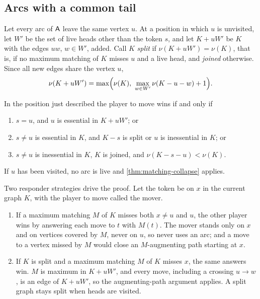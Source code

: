 \subsection{Arcs with a common tail}

Let every arc of $\mathsf{A}$ leave the same vertex $u$. At a position in which $u$ is unvisited, let $W'$ be the set of live heads other than the token $s$, and let $K+uW'$ be $K$ with the edges $uw$, $w\in W'$, added. Call $K$ \emph{split} if $\nu(K+uW')=\nu(K)$, that is, if no maximum matching of $K$ misses $u$ and a live head, and \emph{joined} otherwise. Since all new edges share the vertex $u$,
\begin{equation}\label{eq:star-nu}
\nu(K+uW')=\max\Bigl(\nu(K),\ \max_{w\in W'}\nu(K-u-w)+1\Bigr).
\end{equation}

\begin{theorem}\label{thm:common-tail}
In the position just described the player to move wins if and only if
\begin{enumerate}[label=\textup{(\arabic*)}]
\item $s=u$, and $u$ is essential in $K+uW'$; or
\item $s\neq u$ is essential in $K$, and $K-s$ is split or $u$ is inessential in $K$; or
\item $s\neq u$ is inessential in $K$, $K$ is joined, and $\nu(K-s-u)<\nu(K)$.
\end{enumerate}
If $u$ has been visited, no arc is live and \cref{thm:matching-collapse} applies.
\end{theorem}

Two responder strategies drive the proof. Let the token be on $x$ in the current graph $K$, with the player to move called the mover.

\begin{enumerate}[label=(T\arabic*$'$),start=2]
\item If a maximum matching $M$ of $K$ misses both $x\neq u$ and $u$, the other player wins by answering each move to $t$ with $M(t)$. The mover stands only on $x$ and on vertices covered by $M$, never on $u$, so never uses an arc; and a move to a vertex missed by $M$ would close an $M$-augmenting path starting at $x$.
\item If $K$ is split and a maximum matching $M$ of $K$ misses $x$, the same answers win. $M$ is maximum in $K+uW'$, and every move, including a crossing $u\to w$, is an edge of $K+uW'$, so the augmenting-path argument applies. A split graph stays split when heads are visited.
\end{enumerate}

